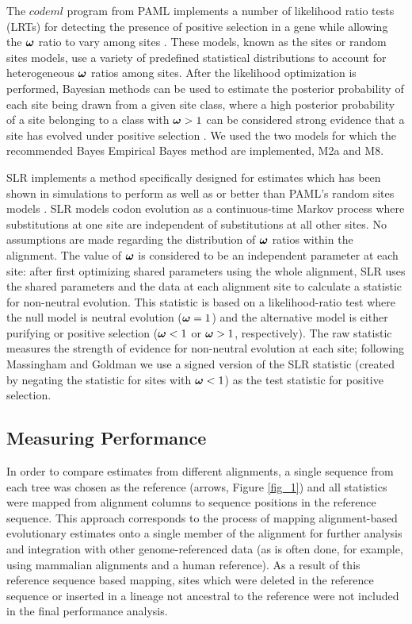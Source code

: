 \documentclass{article}
\begin{document}
The $codeml$ program from PAML implements a number of likelihood ratio
tests (LRTs) for detecting the presence of positive selection in a
gene while allowing the $\bm{\omega}$ ratio to vary among sites
\citep{Yang2000CodonSubstitution}. These models, known as the sites or
random sites models, use a variety of predefined statistical
distributions to account for heterogeneous $\bm{\omega}$ ratios among sites. After
the likelihood optimization is performed, Bayesian methods can be used
to estimate the posterior probability of each site being drawn from a
given site class, where a high posterior probability of a site
belonging to a class with $\bm{\omega}>1$ can be considered strong
evidence that a site has evolved under positive selection
\citep{Yang2005Bayes}. We used the two models for which the
recommended Bayes Empirical Bayes method are implemented, M2a and M8.

SLR implements a method specifically designed for \sw estimates which
has been shown in simulations to perform as well as or better than
PAML's \sw random sites models \citep{Massingham2005Detecting}. SLR
models codon evolution as a continuous-time Markov process where
substitutions at one site are independent of substitutions at all
other sites. No assumptions are made regarding the
distribution of $\bm{\omega}$ ratios within the alignment. The value of
$\bm{\omega}$ is considered to be an independent parameter at each site:
after first optimizing shared parameters using the whole alignment,
SLR uses the shared parameters and the data at each alignment site to
calculate a \sw statistic for non-neutral evolution. This statistic is
based on a likelihood-ratio test where the null model is neutral
evolution ($\bm{\omega}=1$) and the alternative model is either purifying or
positive selection ($\bm{\omega}<1$ or $\bm{\omega}>1$, respectively). The raw
statistic measures the strength of evidence for non-neutral evolution
at each site; following Massingham and Goldman
\citeyearpar{Massingham2005Detecting} we use a signed version of the
SLR statistic (created by negating the statistic for sites with
$\bm{\omega}<1$) as the test statistic for positive selection.

\subsection*{Measuring Performance}

In order to compare \sw estimates from different alignments, a single
sequence from each tree was chosen as the reference (arrows, Figure
\ref{fig_1}) and all \sw statistics were mapped from alignment columns
to sequence positions in the reference sequence. This approach
corresponds to the process of mapping alignment-based evolutionary
estimates onto a single member of the alignment for further analysis
and integration with other genome-referenced data (as is often done,
for example, using mammalian alignments and a human reference). As a
result of this reference sequence based mapping, sites which were
deleted in the reference sequence or inserted in a lineage not
ancestral to the reference were not included in the final performance
analysis.
\end{document}

